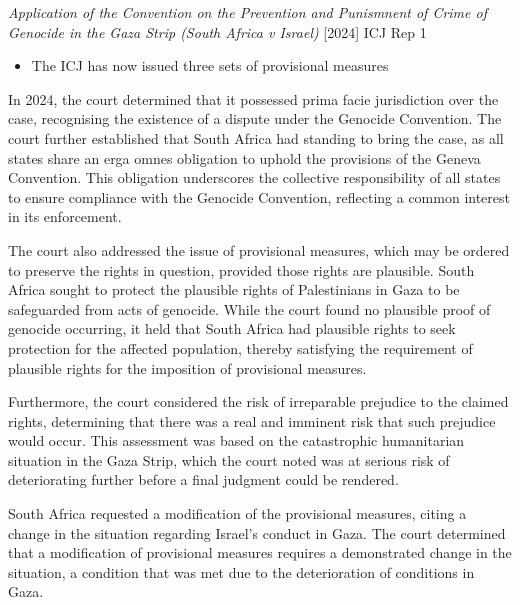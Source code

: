 \begin{casedetails}{\textit{Application of the Convention on the Prevention and Punismnent of Crime of Genocide in the Gaza Strip (South Africa v Israel)} [2024] ICJ Rep 1}
    \flushleft
    \begin{itemize}
        \item The ICJ has now issued three sets of provisional measures
    \end{itemize}
    In 2024, the court determined that it possessed prima facie jurisdiction over the case, recognising the existence of a dispute under the Genocide Convention. The court further established that South Africa had standing to bring the case, as all states share an erga omnes obligation to uphold the provisions of the Geneva Convention. This obligation underscores the collective responsibility of all states to ensure compliance with the Genocide Convention, reflecting a common interest in its enforcement.

    \vspace{\baselineskip}
    
    The court also addressed the issue of provisional measures, which may be ordered to preserve the rights in question, provided those rights are plausible. South Africa sought to protect the plausible rights of Palestinians in Gaza to be safeguarded from acts of genocide. While the court found no plausible proof of genocide occurring, it held that South Africa had plausible rights to seek protection for the affected population, thereby satisfying the requirement of plausible rights for the imposition of provisional measures.

    \vspace{\baselineskip}
    
    Furthermore, the court considered the risk of irreparable prejudice to the claimed rights, determining that there was a real and imminent risk that such prejudice would occur. This assessment was based on the catastrophic humanitarian situation in the Gaza Strip, which the court noted was at serious risk of deteriorating further before a final judgment could be rendered.

    
    South Africa requested a modification of the provisional measures, citing a change in the situation regarding Israel's conduct in Gaza. The court determined that a modification of provisional measures requires a demonstrated change in the situation, a condition that was met due to the deterioration of conditions in Gaza.


\end{casedetails}
